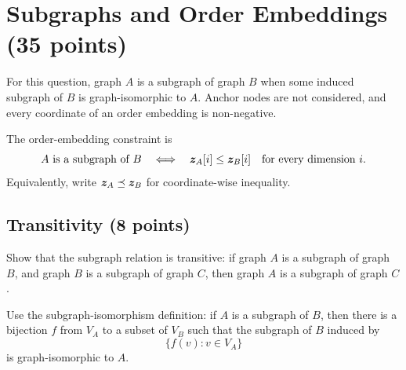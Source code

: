 \clearpage
\section{Subgraphs and Order Embeddings (35 points)}

For this question, graph \(A\) is a subgraph of graph \(B\) when some induced
subgraph of \(B\) is graph-isomorphic to \(A\). Anchor nodes are not considered,
and every coordinate of an order embedding is non-negative.

The order-embedding constraint is
\[
  A\text{ is a subgraph of }B
  \quad\Longleftrightarrow\quad
  \bm{z}_A[i]\leq \bm{z}_B[i]
  \quad\text{for every dimension }i.
\]
Equivalently, write \(\bm{z}_A\preceq\bm{z}_B\) for coordinate-wise
inequality.

\subsection{Transitivity (8 points)}

Show that the subgraph relation is transitive: if graph \(A\) is a subgraph of
graph \(B\), and graph \(B\) is a subgraph of graph \(C\), then graph \(A\) is a
subgraph of graph \(C\).

Use the subgraph-isomorphism definition: if \(A\) is a subgraph of \(B\), then
there is a bijection \(f\) from \(V_A\) to a subset of \(V_B\) such that the
subgraph of \(B\) induced by
\[
  \{f(v):v\in V_A\}
\]
is graph-isomorphic to \(A\).

